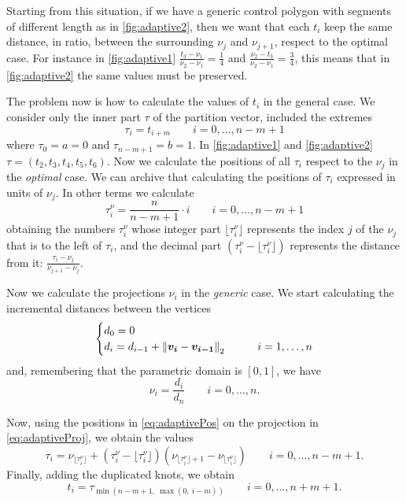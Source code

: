 \documentclass[dissertation.tex]{subfiles}
\begin{document}
Starting from this situation, if
we have a generic control polygon with segments of different length as
in \cref{fig:adaptive2}, then we want that each $t_i$ keep the same
distance, in ratio, between the surrounding $\nu_j$ and $\nu_{j+1}$,
respect to the optimal case. For instance in \cref{fig:adaptive1}
$\frac{t_3-\nu_1}{\nu_2-\nu_1}=\frac{1}{4}$ and
$\frac{\nu_2-t_3}{\nu_2-\nu_1}=\frac{3}{4}$, this means that in
\cref{fig:adaptive2} the same values must be preserved.

The problem now is how to calculate the values of $t_i$ in the general
case. We consider only the inner part $\tau$ of the partition vector,
included the extremes
\begin{equation*}
  \tau_i = t_{i+m}\qquad i=0,\dots,n-m+1
\end{equation*}
where $\tau_0=a=0$ and $\tau_{n-m+1}=b=1$. In \cref{fig:adaptive1} and
\cref{fig:adaptive2}
$\tau=(t_2,t_3,t_4,t_5,t_6)$. Now we calculate the positions of all
$\tau_i$ respect to the $\nu_j$ in the \emph{optimal} case. We can
archive that
calculating the positions of $\tau_i$ expressed in units of $\nu_j$. In
other terms we calculate
\begin{equation}\label{eq:adaptivePos}
  \tau_i^\nu=\frac{n}{n-m+1}\cdot i\qquad i=0,\dots,n-m+1
\end{equation}
obtaining the numbers $\tau_i^\nu$ whose integer part
$\lfloor\tau_i^\nu\rfloor$ represents the index $j$ of the
$\nu_j$ that is to the left of $\tau_i$, and the decimal part
$(\tau_i^\nu-\lfloor\tau_i^\nu\rfloor)$ represents the distance from
it: $\frac{\tau_i-\nu_j}{\nu_{j+1}-\nu_j}$.

Now we calculate the projections $\nu_i$ in the
\emph{generic} case.
We start calculating the incremental distances between
the vertices
\begin{equation*}
  \begin{cases}
    d_0=0&\\
    d_i=d_{i-1}+\left\lVert\boldsymbol{v_i}-\boldsymbol{v_{i-1}}\right\rVert_2&\qquad i=1,\dots,n
  \end{cases}
\end{equation*}
and, remembering that the parametric domain is $[0,1]$, we have
\begin{equation}\label{eq:adaptiveProj}
  \nu_i=\frac{d_i}{d_n}\qquad i=0,\dots,n.
\end{equation}

Now, using the positions in \cref{eq:adaptivePos} on the projection in
\cref{eq:adaptiveProj}, we obtain the values
\begin{equation*}
  \tau_i=\nu_{\lfloor\tau_i^\nu\rfloor}+(\tau_i^\nu-\lfloor\tau_i^\nu\rfloor)(\nu_{\lfloor\tau_i^\nu\rfloor+1}-\nu_{\lfloor\tau_i^\nu\rfloor})\qquad i=0,\dots,n-m+1.
\end{equation*}
Finally, adding the duplicated knots, we obtain
\begin{equation*}
  t_i=\tau_{\min(n-m+1,\ \max(0,\ i-m))}\qquad i=0,\dots,n+m+1.
\end{equation*}
\end{document}
